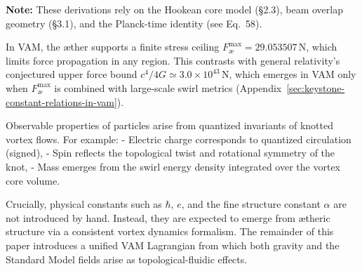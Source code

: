 \vspace{0.5em}
\begin{center}
    \footnotesize
    \textbf{Note:} These derivations rely on the Hookean core model (§2.3), beam overlap geometry (§3.1), and the Planck-time identity (see Eq.~58).
\end{center}

In VAM, the æther supports a finite stress ceiling \( F^{\max}_\text{\ae} = 29.053507\,\mathrm{N}\), which limits force propagation in any region. This contrasts with general relativity’s conjectured upper force bound \(c^4 / 4G \simeq 3.0 \times 10^{43}\,\mathrm{N}\), which emerges in VAM only when \( F^{\max}_\text{\ae}\) is combined with large-scale swirl metrics (Appendix~\ref{sec:keystone-constant-relations-in-vam}).

Observable properties of particles arise from quantized invariants of knotted vortex flows. For example:
- Electric charge corresponds to quantized circulation (signed),
- Spin reflects the topological twist and rotational symmetry of the knot,
- Mass emerges from the swirl energy density integrated over the vortex core volume.

Crucially, physical constants such as \(\hbar\), \(e\), and the fine structure constant \(\alpha\) are not introduced by hand. Instead, they are expected to emerge from ætheric structure via a consistent vortex dynamics formalism. The remainder of this paper introduces a unified VAM Lagrangian from which both gravity and the Standard Model fields arise as topological-fluidic effects.
